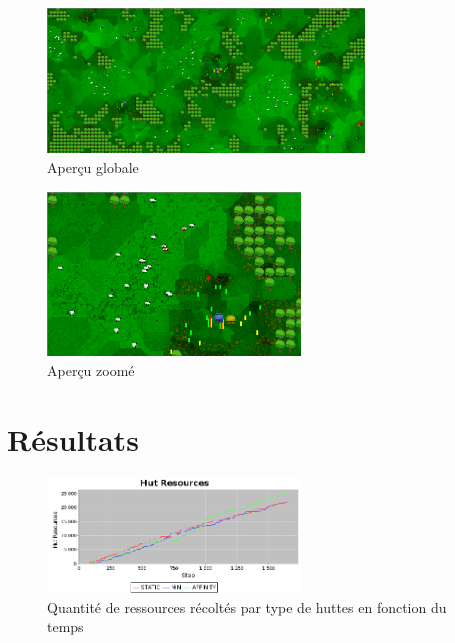   \begin{figure}[H]
    \begin{center}
      \includegraphics[width=0.75\textwidth]{./img/monde1}
      \caption{Aperçu globale}
    \end{center}
  \end{figure}

  \begin{figure}[H]
    \begin{center}
      \includegraphics[width=0.6\textwidth]{./img/monde2}
      \caption{Aperçu zoomé}
    \end{center}
  \end{figure}

\section{Résultats}

  \begin{figure}[H]
    \begin{center}
      \includegraphics[width=0.6\textwidth]{./img/graph_ressources}
      \caption{Quantité de ressources récoltés par type de huttes en
    fonction du temps} 
      \label{fig:resultat}
    \end{center}
  \end{figure}

